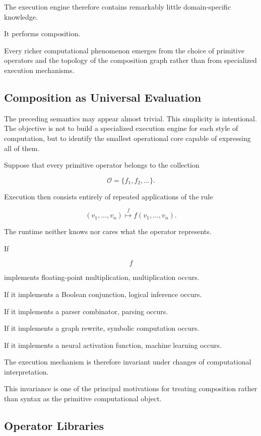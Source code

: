 \documentclass[12pt,oneside]{article}
\begin{document}
The execution engine therefore contains remarkably little domain-specific knowledge.

It performs composition.

Every richer computational phenomenon emerges from the choice of primitive operators and the topology of the composition graph rather than from specialized execution mechanisms.

\subsection{Composition as Universal Evaluation}

The preceding semantics may appear almost trivial. This simplicity is intentional. The objective is not to build a specialized execution engine for each style of computation, but to identify the smallest operational core capable of expressing all of them.

Suppose that every primitive operator belongs to the collection

\[
\mathcal{O}
=
\{f_1,f_2,\ldots\}.
\]

Execution then consists entirely of repeated applications of the rule

\[
(v_1,\ldots,v_n)
\stackrel{f}{\longmapsto}
f(v_1,\ldots,v_n).
\]

The runtime neither knows nor cares what the operator represents.

If

\[
f
\]

implements floating-point multiplication, multiplication occurs.

If it implements a Boolean conjunction, logical inference occurs.

If it implements a parser combinator, parsing occurs.

If it implements a graph rewrite, symbolic computation occurs.

If it implements a neural activation function, machine learning occurs.

The execution mechanism is therefore invariant under changes of computational interpretation.

This invariance is one of the principal motivations for treating composition rather than syntax as the primitive computational object.

\subsection{Operator Libraries}
\end{document}
